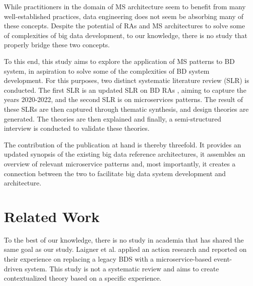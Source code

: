\documentclass[conference]{IEEEtran}
\begin{document}
While practitioners in the domain of MS architecture seem to benefit from many well-established practices, data engineering does not seem be absorbing many of these concepts. Despite the potential of RAs and MS architectures to solve some of complexities of big data development, to our knowledge, there is no study that properly bridge these two concepts. 

To this end, this study aims to explore the application of MS patterns to BD system, in aspiration to solve some of the complexities of BD system development. For this purposes, two distinct systematic literature review (SLR) is conducted. The first SLR is an updated SLR on BD RAs \cite{Ataei.2020}, aiming to capture the years 2020-2022, and the second SLR is on microservices patterns. The result of these SLRs are then captured through thematic synthesis, and design theories are generated. The theories are then explained and finally, a semi-structured interview is conducted to validate these theories.  



The contribution of the publication at hand is thereby threefold. It provides an updated synopsis of the existing big data reference architectures, it assembles an overview of relevant microservice patterns and, most importantly, it creates a connection between the two to facilitate big data system development and architecture.


\section{Related Work}

To the best of our knowledge, there is no study in academia that has shared the same goal as our study. Laigner et al. \cite{laigner2020monolithic} applied an action research and reported on their experience on replacing a legacy BDS with a microservice-based event-driven system. This study is not a systematic review and aims to create contextualized theory based on a specific experience. 
\end{document}
